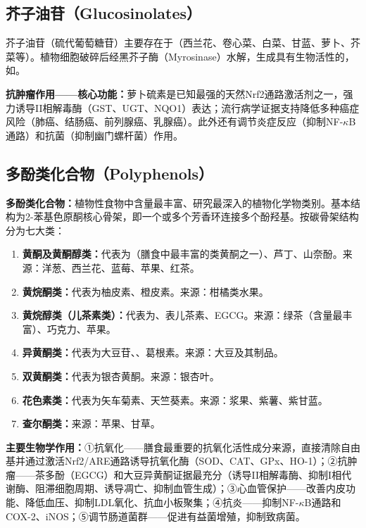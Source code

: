 \subsection{芥子油苷（Glucosinolates）}

芥子油苷（硫代葡萄糖苷）主要存在于（西兰花、卷心菜、白菜、甘蓝、萝卜、芥菜等）。植物细胞破碎后经黑芥子酶（Myrosinase）水解，生成具有生物活性的，如。

\textbf{抗肿瘤作用——核心功能：}萝卜硫素是已知最强的天然Nrf2通路激活剂之一，强力诱导II相解毒酶（GST、UGT、NQO1）表达；流行病学证据支持降低多种癌症风险（肺癌、结肠癌、前列腺癌、乳腺癌）。此外还有调节炎症反应（抑制NF-$\kappa$B通路）和抗菌（抑制幽门螺杆菌）作用。

\subsection{多酚类化合物（Polyphenols）}

\begin{tipbox}
\textbf{多酚类化合物：}植物性食物中含量最丰富、研究最深入的植物化学物类别。基本结构为2-苯基色原酮核心骨架，即一个或多个芳香环连接多个酚羟基。按碳骨架结构分为七大类：

\begin{enumerate}[leftmargin=*]
    \item \textbf{黄酮及黄酮醇类：}代表为（膳食中最丰富的类黄酮之一）、芦丁、山奈酚。来源：洋葱、西兰花、蓝莓、苹果、红茶。
    \item \textbf{黄烷酮类：}代表为柚皮素、橙皮素。来源：柑橘类水果。
    \item \textbf{黄烷醇类（儿茶素类）：}代表为、表儿茶素、EGCG。来源：绿茶（含量最丰富）、巧克力、苹果。
    \item \textbf{异黄酮类：}代表为大豆苷、、葛根素。来源：大豆及其制品。
    \item \textbf{双黄酮类：}代表为银杏黄酮。来源：银杏叶。
    \item \textbf{花色素类：}代表为矢车菊素、天竺葵素。来源：浆果、紫薯、紫甘蓝。
    \item \textbf{查尔酮类：}来源：苹果、甘草。
\end{enumerate}

\textbf{主要生物学作用：}①抗氧化——膳食最重要的抗氧化活性成分来源，直接清除自由基并通过激活Nrf2/ARE通路诱导抗氧化酶（SOD、CAT、GPx、HO-1）；②抗肿瘤——茶多酚（EGCG）和大豆异黄酮证据最充分（诱导II相解毒酶、抑制I相代谢酶、阻滞细胞周期、诱导凋亡、抑制血管生成）；③心血管保护——改善内皮功能、降低血压、抑制LDL氧化、抗血小板聚集；④抗炎——抑制NF-$\kappa$B通路和COX-2、iNOS；⑤调节肠道菌群——促进有益菌增殖，抑制致病菌。
\end{tipbox}

